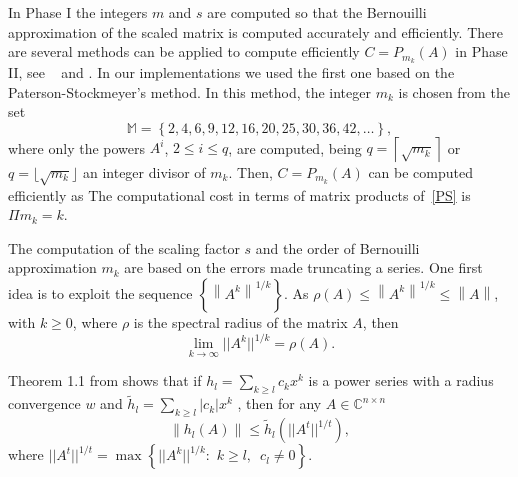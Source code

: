 In Phase I the integers $m$ and $s$ are
computed so that the Bernouilli approximation of the scaled matrix is computed accurately and efficiently. 
There are several methods can be applied to compute efficiently $C=P_{m_k}(A)$ in Phase II, see ~\cite{PaSt73} and \cite{sastre2018efficient}. In our implementations we used the first one based on  the Paterson-Stockmeyer's
method.
In this method, the integer $m_k$ is chosen from the set
\begin{displaymath}
\label{m_k} \mathbb{M}=\left\{2,4, 6, 9,12,16,20,25,30,36,42,\dots\right\},
\end{displaymath}
where  only the  powers $A^i$, $2\leq i\leq
q$, are computed, being $q = \left\lceil {\sqrt
{{m_k}} } \right\rceil $ or $q=\lfloor \sqrt{m_{k}}\rfloor$ an
integer divisor of $m_{k}$. Then, $C=P_{m_k}(A)$ can
be computed efficiently as
{\setlength{}}
The computational cost in terms of matrix products of~\eqref{PS} is $\Pi {m_k} = k$.

The computation of the scaling factor $s$ and the order of Bernouilli approximation $m_{k}$  are based on the errors made truncating a series. One first idea is to exploit the sequence $\left\{ {{{\left\| {{A^k}} \right\|}^{1/k}}} \right\}$.
As $\rho (A) \leqslant {\left\| {{A^k}} \right\|^{1/k}} \leqslant \left\| A \right\|$, with $k \geqslant 0$, where $\rho$ is the spectral radius of the matrix $A$, then 
\[\mathop {\lim }\limits_{k \to \infty } ||{A^k}|{|^{1/k}} = \rho (A).\]

Theorem 1.1 from \cite{High09}
shows that if ${h_l} = \sum\limits_{k\geqslant l}^{} {{c_k}{x^k}}$ is a power series with a radius convergence $w$ and ${{\tilde h}_l} = \sum\limits_{k\geqslant l}^{} {\left| {{c_k}} \right|{x^k}}$ , then for any $A \in {\mathbb{C}^{n \times n}}$ 
$$\left\| {{h_l}(A)} \right\| \leqslant {{\tilde h}_l}(||{A^t}|{|^{1/t}}),$$
where $||{A^t}|{|^{1/t}} = \max \left\{ {||{A^k}|{|^{1/k}}:\,\,k \geqslant l,\,\,\,{c_l} \ne 0} \right\}$.


